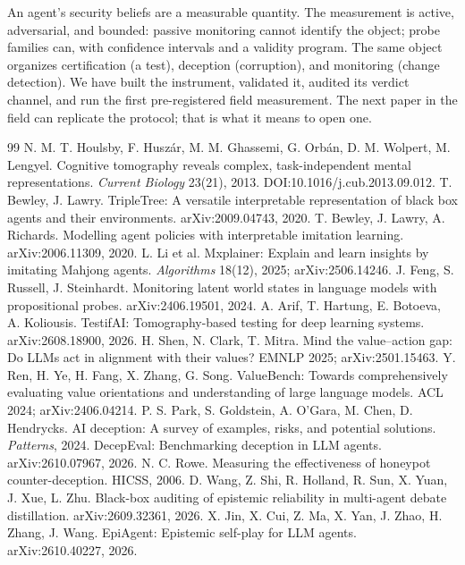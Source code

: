 \documentclass[10pt,twocolumn]{article}
\begin{document}
An agent's security beliefs are a measurable quantity. The measurement is
active, adversarial, and bounded: passive monitoring cannot identify the object;
probe families can, with confidence intervals and a validity program. The same
object organizes certification (a test), deception (corruption), and monitoring
(change detection). We have built the instrument, validated it, audited its
verdict channel, and run the first pre-registered field measurement. The next
paper in the field can replicate the protocol; that is what it means to open
one.

\begin{thebibliography}{99}\small
{} N. M. T. Houlsby, F. Husz\'ar, M. M. Ghassemi, G. Orb\'an, D. M. Wolpert, M. Lengyel. Cognitive tomography reveals complex, task-independent mental representations. \emph{Current Biology} 23(21), 2013. DOI:10.1016/j.cub.2013.09.012.
 T. Bewley, J. Lawry. TripleTree: A versatile interpretable representation of black box agents and their environments. arXiv:2009.04743, 2020.
 T. Bewley, J. Lawry, A. Richards. Modelling agent policies with interpretable imitation learning. arXiv:2006.11309, 2020.
 L. Li et al. Mxplainer: Explain and learn insights by imitating Mahjong agents. \emph{Algorithms} 18(12), 2025; arXiv:2506.14246.
 J. Feng, S. Russell, J. Steinhardt. Monitoring latent world states in language models with propositional probes. arXiv:2406.19501, 2024.
 A. Arif, T. Hartung, E. Botoeva, A. Koliousis. TestifAI: Tomography-based testing for deep learning systems. arXiv:2608.18900, 2026.
 H. Shen, N. Clark, T. Mitra. Mind the value--action gap: Do LLMs act in alignment with their values? EMNLP 2025; arXiv:2501.15463.
 Y. Ren, H. Ye, H. Fang, X. Zhang, G. Song. ValueBench: Towards comprehensively evaluating value orientations and understanding of large language models. ACL 2024; arXiv:2406.04214.
 P. S. Park, S. Goldstein, A. O'Gara, M. Chen, D. Hendrycks. AI deception: A survey of examples, risks, and potential solutions. \emph{Patterns}, 2024.
 DecepEval: Benchmarking deception in LLM agents. arXiv:2610.07967, 2026.
 N. C. Rowe. Measuring the effectiveness of honeypot counter-deception. HICSS, 2006.
 D. Wang, Z. Shi, R. Holland, R. Sun, X. Yuan, J. Xue, L. Zhu. Black-box auditing of epistemic reliability in multi-agent debate distillation. arXiv:2609.32361, 2026.
 X. Jin, X. Cui, Z. Ma, X. Yan, J. Zhao, H. Zhang, J. Wang. EpiAgent: Epistemic self-play for LLM agents. arXiv:2610.40227, 2026.

\end{thebibliography}
\end{document}
